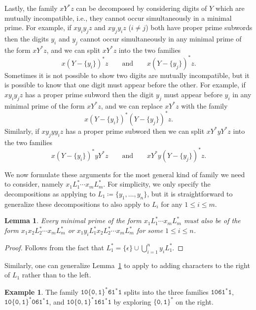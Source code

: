 \documentclass[12pt]{article}
\theoremstyle{plain}
\newtheorem{lemma}[theorem]{Lemma}
\theoremstyle{definition}
\newtheorem{example}[theorem]{Example}
\newcommand{\0}{\mathtt{0}}
\newcommand{\1}{\mathtt{1}}
\newcommand{\2}{\mathtt{2}}
\newcommand{\3}{\mathtt{3}}
\newcommand{\4}{\mathtt{4}}
\newcommand{\5}{\mathtt{5}}
\newcommand{\6}{\mathtt{6}}
\newcommand{\7}{\mathtt{7}}
\newcommand{\8}{\mathtt{8}}
\newcommand{\9}{\mathtt{9}}
\begin{document}
Lastly, the family $xY^*z$ can be decomposed by considering digits of $Y$ which are mutually incompatible,
i.e., they cannot occur simultaneously in a minimal prime.  For example, if $xy_iy_jz$ and $xy_jy_iz$ ($i\neq j$)
both have proper prime subwords then the digits $y_i$ and $y_j$ cannot occur simultaneously in any minimal
prime of the form $xY^*z$, and we can split $xY^*z$ into the two families
\[ x(Y-\{y_i\})^*z \qquad\text{and}\qquad x(Y-\{y_j\})^*z . \]
Sometimes it is not possible to show two digits are mutually incompatible, but it is possible to know that
one digit must appear before the other.  For example, if $xy_iy_jz$ has a proper prime subword then the digit
$y_j$ must appear before $y_i$ in any minimal prime of the form $xY^*z$, and we can replace $xY^*z$
with the family
\[ x(Y-\{y_i\})^*(Y-\{y_j\})^*z . \]
Similarly, if $xy_jyy_iz$ has a proper prime subword then we can split $xY^*yY^*z$ into the two families
\[ x(Y-\{y_i\})^*yY^*z \qquad\text{and}\qquad xY^*y(Y-\{y_j\})^*z . \]

We now formulate these arguments for the most general kind of family we need to consider, namely
$x_1L_1^*\dotsm x_mL_m^*$.  For simplicity, we only specify the decompositions as applying to
$L_1\coloneqq\{y_1,\dotsc,y_n\}$, but it is straightforward to generalize these decompositions
to also apply to $L_i$ for any $1\leq i\leq m$.

\begin{lemma}\label{lemexplore}
Every minimal prime of the form $x_1L_1^*\dotsm x_mL_m^*$ must also be of the form
$x_1x_2L_2^*\dotsm x_mL_m^*$ or $x_1y_iL_1^*x_2L_2^*\dotsm x_mL_m^*$ for some $1\leq i\leq n$.
\end{lemma}
\begin{proof}
Follows from the fact that $L_1^*=\{\epsilon\}\cup\bigcup_{i=1}^n y_iL_1^*$.
\end{proof}
Similarly, one can generalize Lemma~\ref{lemexplore} to apply to adding characters to the right of $L_1$ rather than
to the left.
\begin{example}
The family $\1\0\{\0,\1\}^*\6\1^*\1$ splits into the three families $\1\0\6\1^*\1$, $\1\0\{\0,\1\}^*\0\6\1^*\1$, and $\1\0\{\0,\1\}^*\1\6\1^*\1$
by exploring $\{\0,\1\}^*$ on the right.
\end{example}
\end{document}
